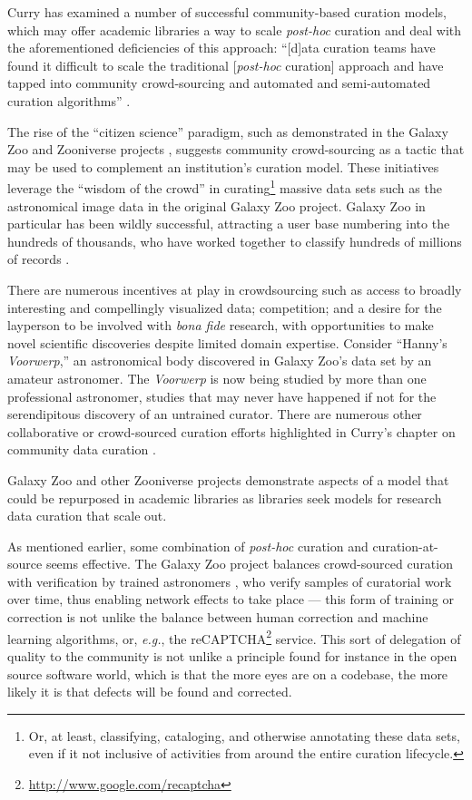 \documentclass{acm_proc_article-sp}
\begin{document}
Curry has examined a number of successful community-based curation
models, which may offer academic libraries a way to scale
\textit{post-hoc} curation and deal with the aforementioned
deficiencies of this approach: ``[d]ata curation teams have found it
difficult to scale the traditional [\textit{post-hoc} curation]
approach and have tapped into community crowd-sourcing and automated
and semi-automated curation algorithms'' \cite{curry:community}.

The rise of the ``citizen science'' paradigm, such as demonstrated in
the Galaxy Zoo and Zooniverse projects
\cite{wiki:galaxyzoo,adams:galaxyzoo}, suggests community
crowd-sourcing as a tactic that may be used to complement an
institution's curation model. These initiatives leverage the ``wisdom
of the crowd'' in curating\footnote{Or, at least, classifying,
  cataloging, and otherwise annotating these data sets, even if it not
  inclusive of activities from around the entire curation lifecycle.}
massive data sets such as the astronomical image data in the original
Galaxy Zoo project. Galaxy Zoo in particular has been wildly
successful, attracting a user base numbering into the hundreds of
thousands, who have worked together to classify hundreds of millions
of records \cite{adams:galaxyzoo}.

There are numerous incentives at play in crowdsourcing such as access
to broadly interesting and compellingly visualized data; competition;
and a desire for the layperson to be involved with \textit{bona fide}
research, with opportunities to make novel scientific discoveries
despite limited domain expertise. Consider ``Hanny's
\textit{Voorwerp}\cite{wiki:voorwerp},'' an astronomical body
discovered in Galaxy Zoo's data set by an amateur astronomer. The
\textit{Voorwerp} is now being studied by more than one professional
astronomer, studies that may never have happened if not for the
serendipitous discovery of an untrained curator.  There are numerous
other collaborative or crowd-sourced curation efforts highlighted in
Curry's chapter on community data curation \cite{curry:community}.

Galaxy Zoo and other Zooniverse projects demonstrate aspects of a
model that could be repurposed in academic libraries as libraries seek
models for research data curation that scale out.

As mentioned earlier, some combination of \textit{post-hoc} curation
and curation-at-source seems effective. The Galaxy Zoo project
balances crowd-sourced curation with verification by trained
astronomers \cite{adams:galaxyzoo}, who verify samples of curatorial
work over time, thus enabling network effects to take place --- this
form of training or correction is not unlike the balance between human
correction and machine learning algorithms, or, \textit{e.g.}, the
reCAPTCHA\footnote{\url{http://www.google.com/recaptcha}} service. This sort
of delegation of quality to the community is not unlike a principle
found for instance in the open source software world, which is that
the more eyes are on a codebase, the more likely it is that defects
will be found and corrected.
\end{document}
